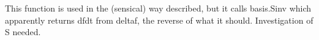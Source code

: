 
\begin{DoxyRefList}
\item[Member \mbox{\hyperlink{classDistribution_afa26bca89c07adccbe3e819553419c1f}{Distribution::apply\+Delta}} (const Eigen\+::\+Vector\+Xd \&dfdt)]\label{todo__todo000001}%
%
This function is used in the (sensical) way described, but it calls basis.\+Sinv which apparently returns dfdt from deltaf, the reverse of what it should. Investigation of S needed. 
\end{DoxyRefList}